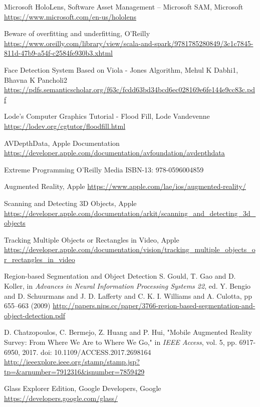 
\begin{thebibliography}{X}


Microsoft HoloLens, Software Asset Management – Microsoft SAM, Microsoft
\url{https://www.microsoft.com/en-us/hololens}

Beware of overfitting and underfitting, O'Reilly
\url{https://www.oreilly.com/library/view/scala-and-spark/9781785280849/3c1c7845-811d-47b9-a54f-c2584fe930b3.xhtml}

Face Detection System Based on Viola - Jones Algorithm, Mehul K Dabhi1, Bhavna K Pancholi2
\url{https://pdfs.semanticscholar.org/f63c/fcdd63bd34bcd6ec028169e6fe144e9cc83c.pdf}

Lode's Computer Graphics Tutorial - Flood Fill, Lode Vandevenne
\url{https://lodev.org/cgtutor/floodfill.html}

AVDepthData, Apple Documentation
\url{https://developer.apple.com/documentation/avfoundation/avdepthdata}

Extreme Programming
O'Reilly Media
ISBN-13: 978-0596004859

Augmented Reality, Apple
\url{https://www.apple.com/lae/ios/augmented-reality/}

Scanning and Detecting 3D Objects, Apple
\url{https://developer.apple.com/documentation/arkit/scanning_and_detecting_3d_objects}

Tracking Multiple Objects or Rectangles in Video, Apple
\url{https://developer.apple.com/documentation/vision/tracking_multiple_objects_or_rectangles_in_video}

Region-based Segmentation and Object Detection
S. Gould, T. Gao and D. Koller, in \textit{Advances in Neural Information Processing Systems 22}, 
ed. Y. Bengio and D. Schuurmans and J. D. Lafferty 
and C. K. I. Williams and A. Culotta, 
pp 655--663
(2009)
\url{http://papers.nips.cc/paper/3766-region-based-segmentation-and-object-detection.pdf}

D. Chatzopoulos, C. Bermejo, Z. Huang and P. Hui, "Mobile Augmented Reality Survey: From Where We Are to Where We Go," in \textit{IEEE Access}, vol. 5, pp. 6917-6950, 2017.
doi: 10.1109/ACCESS.2017.2698164
\url{http://ieeexplore.ieee.org/stamp/stamp.jsp?tp=&arnumber=7912316&isnumber=7859429}

Glass Explorer Edition, Google Developers, Google
\url{https://developers.google.com/glass/}


\end{thebibliography}
